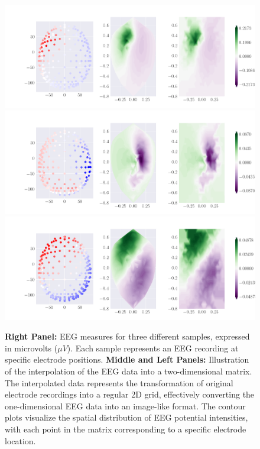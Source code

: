 \documentclass[a4paper, UKenglish, 11pt]{uiomaster}
\begin{document}
\begin{figure}[!htb]
\centering
\includegraphics[width=\linewidth]{../Code/plots/finals/new_eeg_dipole_pos_0.png}
\includegraphics[width=\linewidth]{../Code/plots/finals/new_eeg_dipole_pos_4.png}
\includegraphics[width=\linewidth]{../Code/plots/finals/new_eeg_dipole_pos_6.png}

\caption{\newline
\textbf{Right Panel:} EEG measures for three different samples, expressed in microvolts ($\mu V$). Each sample represents an EEG recording at specific electrode positions. \newline
\textbf{Middle and Left Panels:} Illustration of the interpolation of the EEG data into a two-dimensional matrix. The interpolated data represents the transformation of original electrode recordings into a regular 2D grid, effectively converting the one-dimensional EEG data into an image-like format. The contour plots visualize the spatial distribution of EEG potential intensities, with each point in the matrix corresponding to a specific electrode location.}
\label{fig:eeg_dipole_pos_0}

\end{figure}
\end{document}

